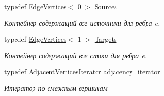 \begin{DoxyCompactItemize}
typedef \hyperlink{class_s_p_u___g_r_a_p_h_1_1_spu_ultra_graph_1_1_edge_vertices}{Edge\+Vertices}$<$ 0 $>$ \hyperlink{class_s_p_u___g_r_a_p_h_1_1_spu_ultra_graph_affd7f90cfb9b255be603cb8756dfc80d}{Sources}
\begin{DoxyCompactList}\small\item\em Контейнер содержащий все источники для ребра e. \end{DoxyCompactList}\item 
\mbox{\label{class_s_p_u___g_r_a_p_h_1_1_spu_ultra_graph_ae5b5d18bbcc112b25285ad2c06d32f07}} 
typedef \hyperlink{class_s_p_u___g_r_a_p_h_1_1_spu_ultra_graph_1_1_edge_vertices}{Edge\+Vertices}$<$ 1 $>$ \hyperlink{class_s_p_u___g_r_a_p_h_1_1_spu_ultra_graph_ae5b5d18bbcc112b25285ad2c06d32f07}{Targets}
\begin{DoxyCompactList}\small\item\em Контейнер содержащий все стоки для ребра e. \end{DoxyCompactList}\item 
\mbox{\label{class_s_p_u___g_r_a_p_h_1_1_spu_ultra_graph_ae50dab54e277cf22d3e318d468e7585c}} 
typedef \hyperlink{class_s_p_u___g_r_a_p_h_1_1_spu_ultra_graph_1_1_adjacent_vertices_iterator}{Adjacent\+Vertices\+Iterator} \hyperlink{class_s_p_u___g_r_a_p_h_1_1_spu_ultra_graph_ae50dab54e277cf22d3e318d468e7585c}{adjacency\+\_\+iterator}
\begin{DoxyCompactList}\small\item\em Итератор по смежным вершинам \end{DoxyCompactList}\end{DoxyCompactItemize}
